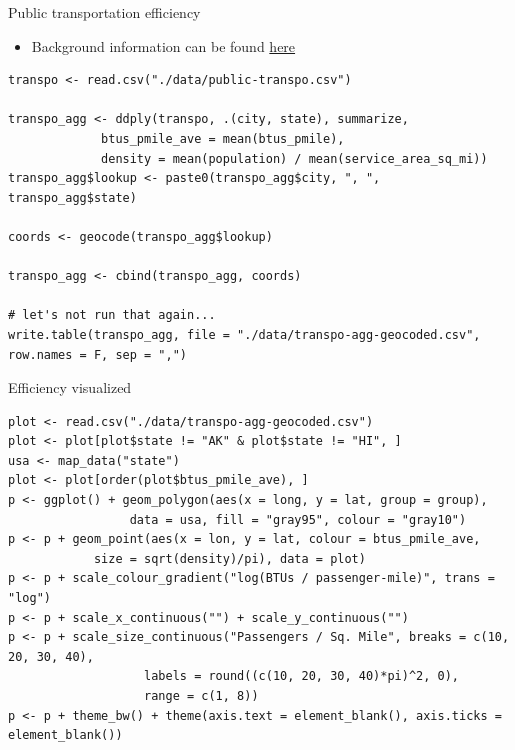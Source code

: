 \documentclass[sans,aspectratio=169,presentation,bigger,fleqn]{beamer}
\begin{document}
\begin{frame}[fragile,label=sec-28]{Public transportation efficiency}
 \begin{itemize}
\item Background information can be found \href{https://github.com/tcrug/public-transpo}{here}
\end{itemize}

\scriptsize

\begin{verbatim}
transpo <- read.csv("./data/public-transpo.csv")

transpo_agg <- ddply(transpo, .(city, state), summarize,
		     btus_pmile_ave = mean(btus_pmile),
		     density = mean(population) / mean(service_area_sq_mi))
transpo_agg$lookup <- paste0(transpo_agg$city, ", ", transpo_agg$state)

coords <- geocode(transpo_agg$lookup)

transpo_agg <- cbind(transpo_agg, coords)

# let's not run that again...
write.table(transpo_agg, file = "./data/transpo-agg-geocoded.csv", row.names = F, sep = ",")
\end{verbatim}
\normalsize
\end{frame}
\begin{frame}[fragile,label=sec-29]{Efficiency visualized}
 \scriptsize

\begin{verbatim}
plot <- read.csv("./data/transpo-agg-geocoded.csv")
plot <- plot[plot$state != "AK" & plot$state != "HI", ]
usa <- map_data("state")
plot <- plot[order(plot$btus_pmile_ave), ]
p <- ggplot() + geom_polygon(aes(x = long, y = lat, group = group),
			     data = usa, fill = "gray95", colour = "gray10")
p <- p + geom_point(aes(x = lon, y = lat, colour = btus_pmile_ave,
		    size = sqrt(density)/pi), data = plot)
p <- p + scale_colour_gradient("log(BTUs / passenger-mile)", trans = "log")
p <- p + scale_x_continuous("") + scale_y_continuous("")
p <- p + scale_size_continuous("Passengers / Sq. Mile", breaks = c(10, 20, 30, 40),
			       labels = round((c(10, 20, 30, 40)*pi)^2, 0),
			       range = c(1, 8))
p <- p + theme_bw() + theme(axis.text = element_blank(), axis.ticks = element_blank())
\end{verbatim}

\normalsize
\end{frame}
\end{document}
